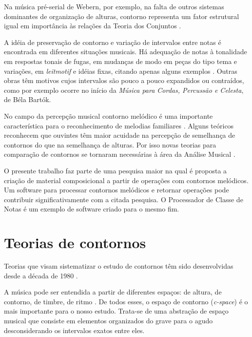 \documentclass{article}
\newcommand{\eng}[1]{\textit{#1}}
\newcommand{\opus}[1]{\textit{#1}}
\begin{document}
Na música pré-serial de Webern, por exemplo, na falta de outros
sistemas dominantes de organização de alturas, contorno representa um
fator estrutural igual em importância às relações da Teoria dos
Conjuntos \cite[p. 157]{clifford95:contour}.

A idéia de preservação de contorno e variação de intervalos entre
notas é encontrada em diferentes situações musicais. Há adequação de
notas à tonalidade em respostas tonais de fugas, em mudanças de modo
em peças do tipo tema e variações, em \eng{leitmotif} e idéias fixas,
citando apenas alguns exemplos
\cite[p. 29]{morris87:composition}. Outras obras têm motivos cujos
intervalos são pouco a pouco expandidos ou contraídos, como por
exemplo ocorre no início da \opus{Música para Cordas, Percussão e
  Celesta}, de Béla Bartók.

No campo da percepção musical contorno melódico é uma importante
característica para o reconhecimento de melodias familiares
\cite[p. 136]{dowling.ea86:music}. Alguns teóricos reconhecem que
ouvintes têm maior acuidade na percepção de semelhança de contornos do
que na semelhança de alturas. Por isso novas teorias para comparação
de contornos se tornaram necessárias à área da Análise Musical
\cite[p. 226]{marvin.ea87:relating}.


O presente trabalho faz parte de uma pesquisa maior na qual é proposta
a criação de material composicional a partir de operações com
contornos melódicos. Um software para processar contornos melódicos e
retornar operações pode contribuir significativamente com a citada
pesquisa. O Processador de Classe de Notas \cite{oliveira01:pcn} é um
exemplo de software criado para o mesmo fim.

\section{Teorias de contornos}
\label{sec:teorias-de-contornos}

Teorias que visam sistematizar o estudo de contornos têm sido
desenvolvidas desde a década de 1980
\cite{friedmann85:methodology,friedmann87:response,morris87:composition,morris93:directions,marvin.ea87:relating,clifford95:contour,polansky.ea92:possible,quinn97:fuzzy,beard03:contour}.

A música pode ser entendida a partir de diferentes espaços: de altura,
de contorno, de timbre, de ritmo \cite{morris87:composition}. De todos
esses, o espaço de contorno (\eng{c-space}) é o mais importante para o
nosso estudo. Trata-se de uma abstração de espaço musical que consiste
em elementos organizados do grave para o agudo desconsiderando os
intervalos exatos entre eles.
\end{document}

